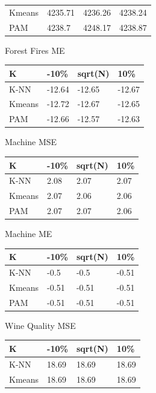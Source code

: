 \documentclass[twoside,11pt]{article}
\begin{document}
\begin{table}[ht]
\begin{minipage}[b]{0.45\linewidth}
\begin{tabular}{llll}
			Kmeans & 4235.71 & 4236.26 & 4238.24 \\
			PAM    & 4238.7  & 4248.17 & 4238.87
		\end{tabular}
	\end{minipage}
	\hspace{0.5cm}\centering
	\begin{minipage}[b]{0.45\linewidth}
		Forest Fires ME
		\centering
		\begin{tabular}{llll}
			\hline
			K      & -10\%  & sqrt(N) & 10\%   \\ \hline
			K-NN   & -12.64 & -12.65  & -12.67 \\
			Kmeans & -12.72 & -12.67  & -12.65 \\
			PAM    & -12.66 & -12.57  & -12.63
		\end{tabular}
	\end{minipage}
	\begin{minipage}[b]{0.45\linewidth}\centering
		Machine MSE
		\begin{tabular}{llll}
			\hline
			K      & -10\% & sqrt(N) & 10\% \\ \hline
			K-NN   & 2.08  & 2.07    & 2.07 \\
			Kmeans & 2.07  & 2.06    & 2.06 \\
			PAM    & 2.07  & 2.07    & 2.06
		\end{tabular}
	\end{minipage}
	\hspace{0.5cm}\centering
	\begin{minipage}[b]{0.45\linewidth}
		Machine ME
		\centering
		\begin{tabular}{llll}
			\hline
			K      & -10\% & sqrt(N) & 10\%  \\ \hline
			K-NN   & -0.5  & -0.5    & -0.51 \\
			Kmeans & -0.51 & -0.51   & -0.51 \\
			PAM    & -0.51 & -0.51   & -0.51
		\end{tabular}
	\end{minipage}
	\centering
	\begin{minipage}[b]{0.45\linewidth}\centering
		Wine Quality MSE
		\begin{tabular}{llll}
			\hline
			K      & -10\% & sqrt(N) & 10\%  \\ \hline
			K-NN   & 18.69 & 18.69   & 18.69 \\
			Kmeans & 18.69 & 18.69   & 18.69 \\

\end{tabular}
\end{minipage}
\end{table}
\end{document}
